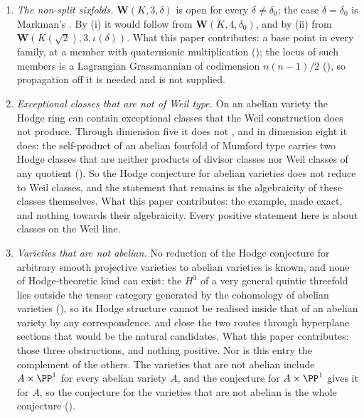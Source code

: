 \begin{enumerate}[label=\textup{(C\arabic*)},leftmargin=3.0em,itemsep=4pt]
  (), and the two propagation criteria
  (); so the higher CM fields are the same
  propagation problem as the quadratic ones, and not a separate entry. For a
  quartic field at $n=2$,  determines how far divisor
  classes, scalar extension and correspondences reach, and computes the
  number that the corrected criterion asks of one complex.
   places the imaginary quadratic case inside Albert's
  classification.
\item \emph{The non-split sixfolds.} $\mathbf{W}(K,3,\delta)$ is open for
  every $\delta\ne\delta_{0}$; the case $\delta=\delta_{0}$ is Markman's
  \cite{Mar25a}. By (i) it would follow from
  $\mathbf{W}(K,4,\delta_{0})$, and by (ii) from
  $\mathbf{W}(K(\sqrt2),3,\iota(\delta))$. What this paper contributes: a base
  point in every family, at a member with quaternionic multiplication
  (); the locus of such members is a Lagrangian
  Grassmannian of codimension $n(n-1)/2$ (), so
  propagation off it is needed and is not supplied.
\item \emph{Exceptional classes that are not of Weil type.} On an abelian
  variety the Hodge ring can contain exceptional classes that the Weil
  construction does not produce. Through dimension five it does not
  \cite{MZ99}, and in dimension eight it does: the self-product of an abelian
  fourfold of Mumford type carries two Hodge classes that are neither
  products of divisor classes nor Weil classes of any quotient
  (). So the Hodge conjecture for abelian varieties
  does not reduce to Weil classes, and the statement that remains is the
  algebraicity of these classes themselves. What this paper contributes: the
  example, made exact, and nothing towards their algebraicity. Every positive
  statement here is about classes on the Weil line.
\item \emph{Varieties that are not abelian.} No reduction of the Hodge
  conjecture for arbitrary smooth projective varieties to abelian varieties is
  known, and none of Hodge-theoretic kind can exist: the $H^{3}$ of a very
  general quintic threefold lies outside the tensor category generated by the
  cohomology of abelian varieties (), so its Hodge
  structure cannot be realised inside that of an abelian variety by any
  correspondence.  and  close the
  two routes through hyperplane sections that would be the natural candidates.
  What this paper contributes: those three obstructions, and nothing positive.
  Nor is this entry the complement of the others. The varieties that are not
  abelian include $A\times\PP^{1}$ for every abelian variety $A$, and the
  conjecture for $A\times\PP^{1}$ gives it for $A$, so the conjecture for
  the varieties that are not abelian is the whole conjecture
  ().
\end{enumerate}


